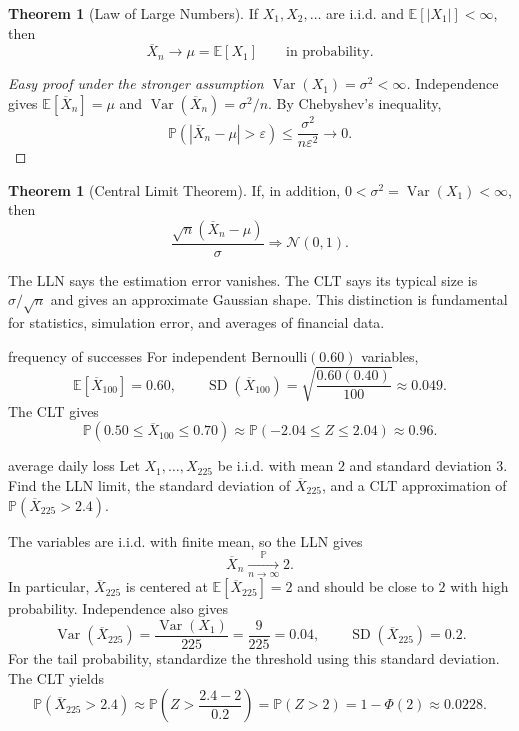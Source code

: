 \documentclass[10pt]{article}
\newcommand{\E}{\mathbb E}
\newcommand{\Pbb}{\mathbb P}
\newcommand{\Var}{\operatorname{Var}}
\newcommand{\SD}{\operatorname{SD}}
\newcommand{\1}{\mathbf 1}
\theoremstyle{definition}
\newtheorem{theorem}[definition]{Theorem}
\begin{document}
\begin{theorem}[Law of Large Numbers]
If $X_1,X_2,\ldots$ are i.i.d. and $\E[|X_1|]<\infty$, then
\[
\overline X_n\longrightarrow\mu=\E[X_1]
\qquad\text{in probability.}
\]
\end{theorem}

\begin{proof}[Easy proof under the stronger assumption $\Var(X_1)=\sigma^2<\infty$]
Independence gives $\E[\overline X_n]=\mu$ and
$\Var(\overline X_n)=\sigma^2/n$. By Chebyshev's inequality,
\[
\Pbb(|\overline X_n-\mu|>\varepsilon)
\le\frac{\sigma^2}{n\varepsilon^2}\longrightarrow0.
\]
\end{proof}

\begin{theorem}[Central Limit Theorem]
If, in addition, $0<\sigma^2=\Var(X_1)<\infty$, then
\[
\frac{\sqrt n(\overline X_n-\mu)}{\sigma}
\Rightarrow\mathcal N(0,1).
\]
\end{theorem}

The LLN says the estimation error vanishes. The CLT says its typical size is
$\sigma/\sqrt n$ and gives an approximate Gaussian shape. This distinction is
fundamental for statistics, simulation error, and averages of financial data.

\begin{boardexample}{frequency of successes}
For independent Bernoulli$(0.60)$ variables,
\[
\E[\overline X_{100}]=0.60,
\qquad
\SD(\overline X_{100})
=\sqrt{\frac{0.60(0.40)}{100}}\approx0.049.
\]
The CLT gives
\[
\Pbb(0.50\le\overline X_{100}\le0.70)
\approx\Pbb(-2.04\le Z\le2.04)\approx0.96.
\]
\end{boardexample}

\begin{studentexercise}{average daily loss}
Let $X_1,\ldots,X_{225}$ be i.i.d. with mean $2$ and standard deviation $3$.
Find the LLN limit, the standard deviation of $\overline X_{225}$, and a CLT
approximation of $\Pbb(\overline X_{225}>2.4)$.
\end{studentexercise}
\begin{shortsolution}
The variables are i.i.d. with finite mean, so the LLN gives
\[
\overline X_n\xrightarrow[n\to\infty]{\Pbb}2.
\]
In particular, $\overline X_{225}$ is centered at
$\E[\overline X_{225}]=2$ and should be close to $2$ with high probability.
Independence also gives
\[
\Var(\overline X_{225})
=\frac{\Var(X_1)}{225}
=\frac9{225}=0.04,
\qquad
\SD(\overline X_{225})=0.2.
\]
For the tail probability, standardize the threshold using this standard
deviation. The CLT yields
\[
\Pbb(\overline X_{225}>2.4)
\approx\Pbb\!\left(Z>\frac{2.4-2}{0.2}\right)
=\Pbb(Z>2)=1-\Phi(2)\approx0.0228.
\]
\end{shortsolution}
\end{document}
